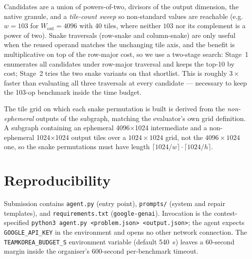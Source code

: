 Candidates are a union of powers-of-two, divisors of the output
dimension, the native granule, and a \emph{tile-count sweep} so
non-standard values are reachable (e.g.\ $w = 103$ for
$W_\mathrm{out} = 4096$ with 40 tiles, where neither $103$ nor its
complement is a power of two). Snake traversals (row-snake and
column-snake) are only useful when the reused operand matches the
unchanging tile axis, and the benefit is multiplicative on top of the
row-major cost, so we use a two-stage search: Stage~1 enumerates all
candidates under row-major traversal and keeps the top-10 by cost;
Stage~2 tries the two snake variants on that shortlist. This is
roughly $3\times$ faster than evaluating all three traversals at
every candidate --- necessary to keep the 103-op benchmark inside the
time budget.

The tile grid on which each snake permutation is built is derived
from the \emph{non-ephemeral} outputs of the subgraph, matching the
evaluator's own grid definition. A subgraph containing an ephemeral
4096$\times$1024 intermediate and a non-ephemeral 1024$\times$1024
output tiles over a $1024\times 1024$ grid, not the $4096\times 1024$
one, so the snake permutations must have length $\lceil 1024/w
\rceil \cdot \lceil 1024/h \rceil$.


\section{Reproducibility}

Submission contains \texttt{agent.py} (entry point),
\texttt{prompts/} (system and repair templates), and
\texttt{requirements.txt} (\texttt{google-genai}). Invocation is the
contest-specified
\texttt{python3 agent.py <problem.json> <output.json>}; the agent
expects \texttt{GOOGLE\_API\_KEY} in the environment and opens no
other network connection. The \texttt{TEAMKOREA\_BUDGET\_S} environment
variable (default 540~s) leaves a 60-second margin inside the
organiser's 600-second per-benchmark timeout.
